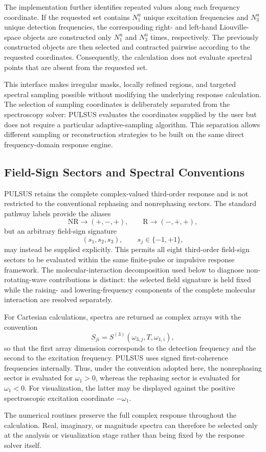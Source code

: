 The implementation further identifies repeated values along each
frequency coordinate.
If the requested set contains $N_1^{\mathrm{u}}$ unique excitation
frequencies and $N_3^{\mathrm{u}}$ unique detection frequencies, the
corresponding right- and left-hand Liouville-space objects are
constructed only
$N_1^{\mathrm{u}}$ and $N_3^{\mathrm{u}}$ times, respectively.
The previously constructed objects are then selected and contracted
pairwise according to the requested coordinates.
Consequently, the calculation does not evaluate spectral points that
are absent from the requested set.

This interface makes irregular masks, locally refined regions, and
targeted spectral sampling possible without modifying the underlying
response calculation.
The selection of sampling coordinates is deliberately separated from
the spectroscopy solver: PULSUS evaluates the coordinates supplied by
the user but does not require a particular adaptive-sampling algorithm.
This separation allows different sampling or reconstruction strategies
to be built on the same direct frequency-domain response engine.

\subsection{Field-Sign Sectors and Spectral Conventions}
\label{sec:software_signatures}

PULSUS retains the complete complex-valued third-order response and is
not restricted to the conventional rephasing and nonrephasing sectors.
The standard pathway labels provide the aliases
%
\begin{equation}
\mathrm{NR}\rightarrow(+,-,+),
\qquad
\mathrm{R}\rightarrow(-,+,+),
\end{equation}
%
but an arbitrary field-sign signature
%
\begin{equation}
(s_1,s_2,s_3),
\qquad
s_j\in\{-1,+1\},
\end{equation}
%
may instead be supplied explicitly. This permits all eight
third-order field-sign sectors to be evaluated within the
same finite-pulse or impulsive response framework. The
molecular-interaction decomposition used below to diagnose
non-rotating-wave contributions is distinct: the selected
field signature is held fixed while the raising- and
lowering-frequency components of the complete molecular
interaction are resolved separately.

For Cartesian calculations, spectra are returned as complex arrays
with the convention
%
\begin{equation}
S_{ji}
=
S^{(3)}(\omega_{3,j},T,\omega_{1,i}),
\end{equation}
%
so that the first array dimension corresponds to the detection
frequency and the second to the excitation frequency.
PULSUS uses signed first-coherence frequencies internally.
Thus, under the convention adopted here, the nonrephasing sector is
evaluated for $\omega_1>0$, whereas the rephasing sector is evaluated
for $\omega_1<0$.
For visualization, the latter may be displayed against the positive
spectroscopic excitation coordinate $-\omega_1$.

The numerical routines preserve the full complex response throughout
the calculation.
Real, imaginary, or magnitude spectra can therefore be selected only
at the analysis or visualization stage rather than being fixed by the
response solver itself.